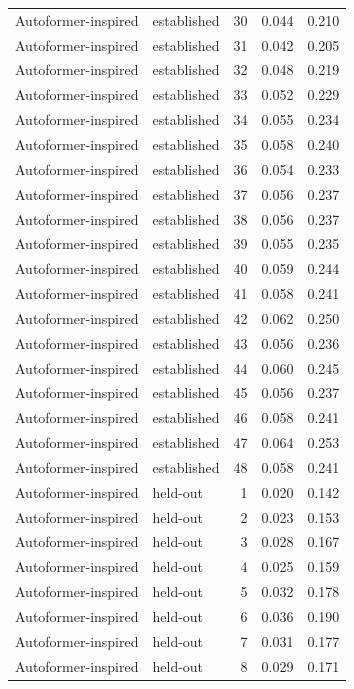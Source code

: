 \begin{tabular}{llrrr}
Autoformer-inspired & established & 30 & 0.044 & 0.210 \\
Autoformer-inspired & established & 31 & 0.042 & 0.205 \\
Autoformer-inspired & established & 32 & 0.048 & 0.219 \\
Autoformer-inspired & established & 33 & 0.052 & 0.229 \\
Autoformer-inspired & established & 34 & 0.055 & 0.234 \\
Autoformer-inspired & established & 35 & 0.058 & 0.240 \\
Autoformer-inspired & established & 36 & 0.054 & 0.233 \\
Autoformer-inspired & established & 37 & 0.056 & 0.237 \\
Autoformer-inspired & established & 38 & 0.056 & 0.237 \\
Autoformer-inspired & established & 39 & 0.055 & 0.235 \\
Autoformer-inspired & established & 40 & 0.059 & 0.244 \\
Autoformer-inspired & established & 41 & 0.058 & 0.241 \\
Autoformer-inspired & established & 42 & 0.062 & 0.250 \\
Autoformer-inspired & established & 43 & 0.056 & 0.236 \\
Autoformer-inspired & established & 44 & 0.060 & 0.245 \\
Autoformer-inspired & established & 45 & 0.056 & 0.237 \\
Autoformer-inspired & established & 46 & 0.058 & 0.241 \\
Autoformer-inspired & established & 47 & 0.064 & 0.253 \\
Autoformer-inspired & established & 48 & 0.058 & 0.241 \\
Autoformer-inspired & held-out & 1 & 0.020 & 0.142 \\
Autoformer-inspired & held-out & 2 & 0.023 & 0.153 \\
Autoformer-inspired & held-out & 3 & 0.028 & 0.167 \\
Autoformer-inspired & held-out & 4 & 0.025 & 0.159 \\
Autoformer-inspired & held-out & 5 & 0.032 & 0.178 \\
Autoformer-inspired & held-out & 6 & 0.036 & 0.190 \\
Autoformer-inspired & held-out & 7 & 0.031 & 0.177 \\
Autoformer-inspired & held-out & 8 & 0.029 & 0.171 \\

\end{tabular}

